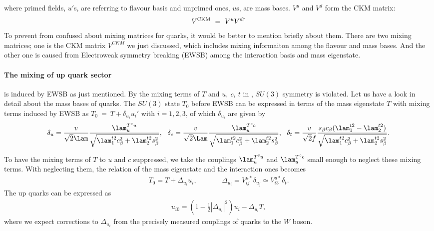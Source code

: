 where primed fields, $u'$s, are referring to flavour basis and unprimed ones, $u$s, are mass bases. $V^u$ and $V^d$ form the CKM matrix:
\begin{align}
 V^{\rm{CKM}}~=~V^u V^{d\dagger}
\end{align}
To prevent from confused about mixing matrices for quarks, it would be better to mention briefly about them.
There are two mixing matrices; one is the CKM matrix $V^{CKM}$ we just discussed, which includes mixing informaiton among the flavour and mass bases.
And the other one is caused from Electroweak symmetry breaking (EWSB) among the interaction basis and mass eigenstate. 

\paragraph{The mixing of up quark sector} is induced by EWSB as just mentioned.
By the mixing terms of $T$ and $u,~c,~t$ in , $SU(3)$ symmetry is violated. 
Let us have a look in detail about the mass bases of quarks.
The $SU(3)$ state $T_0$ before EWSB can be expressed in terms of the mass eigenstate $T$ with mixing terms induced by EWSB 
as $T_0~=~T+\delta_{u_i}u_i'$ with $i=1,2,3$, of which $\delta_{u_i}$ are given by
\begin{align}
 \delta_u = \frac{v}{\sqrt{2}\Lam}\frac{\lam_u^{T^c u}}{\sqrt{\lam_1^{t2}c_\beta^2 + \lam_2^{t2} s_\beta^2}}, ~~
 \delta_c = \frac{v}{\sqrt{2}\Lam}\frac{\lam_u^{T^c c}}{\sqrt{\lam_1^{t2}c_\beta^2 + \lam_2^{t2}s_\beta^2}},~~
 \delta_t = \frac{v}{\sqrt{2}f}\frac{s_\beta c_\beta (\lam_1^{t2} - \lam_2^{t2} )}{\sqrt{\lam_1^{t2}c_\beta^2 + \lam_2^{t2}s_\beta^2}}.
\end{align}

To have the mixing terms of $T$ to $u$ and $c$ suppressed, we take the couplings $\lam_u^{T^c u}$ and $\lam_u^{T^c c}$ small enough to neglect these mixing terms.
With neglecting them, the relation of the mass eigenstate and the interaction ones becomes
\begin{align}
T_0 = T+ \Delta_{u_i} u_i, ~~~~~~~~~~~~~~~~ \Delta_{u_i} = V_{ij}^{u*} \delta_{u_j} \simeq V_{i3}^{u*} \delta_t. 
\end{align}
The up quarks can be expressed as 
\begin{align}
 u_{i0} = (1-\frac{1}{2}|\Delta_{u_i}|^2)u_i - \Delta_{u_i} T,
\end{align}
where we expect corrections to $\Delta_{u_i}$ from the precisely measured couplings of quarks to the $W$ boson.



